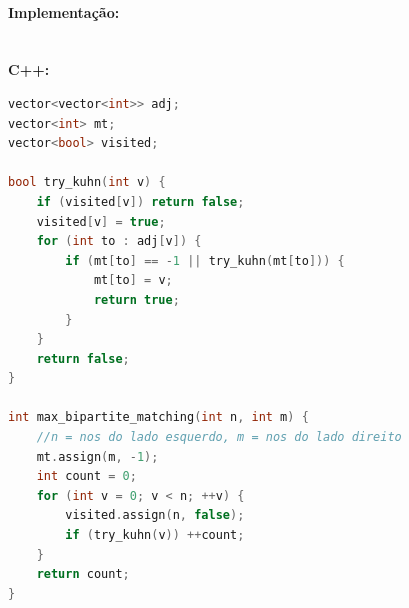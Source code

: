 \vspace{0.3cm}
\newpage
\paragraph{Implementação: }\mbox{}\\
\textbf{C++:}
\begin{lstlisting}[language=C++]
vector<vector<int>> adj;
vector<int> mt;
vector<bool> visited;

bool try_kuhn(int v) {
    if (visited[v]) return false;
    visited[v] = true;
    for (int to : adj[v]) {
        if (mt[to] == -1 || try_kuhn(mt[to])) {
            mt[to] = v;
            return true;
        }
    }
    return false;
}

int max_bipartite_matching(int n, int m) {
    //n = nos do lado esquerdo, m = nos do lado direito
    mt.assign(m, -1);
    int count = 0;
    for (int v = 0; v < n; ++v) {
        visited.assign(n, false);
        if (try_kuhn(v)) ++count;
    }
    return count;
}
\end{lstlisting}
\newpage